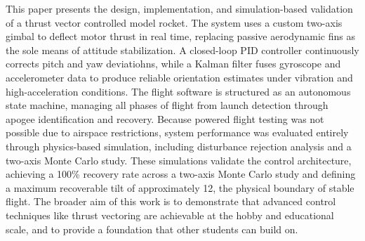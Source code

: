 This paper presents the design, implementation, and simulation-based validation of a thrust vector
controlled model rocket. The system uses a custom two-axis gimbal to deflect motor thrust in real time,
replacing passive aerodynamic fins as the sole means of attitude stabilization. A closed-loop PID controller continuously corrects pitch and yaw deviatiohns, while a Kalman filter fuses gyroscope and accelerometer data to produce reliable orientation estimates under vibration and high-acceleration conditions. 
The flight software is structured as an autonomous state machine, managing all phases of
flight from launch detection through apogee identification and recovery. Because powered flight testing
was not possible due to airspace restrictions, system performance was evaluated entirely through
physics-based simulation, including disturbance rejection analysis and a two-axis Monte Carlo study.
These simulations validate the control architecture, achieving a 100\% recovery rate across a two-axis Monte Carlo study and defining a maximum recoverable tilt of approximately 12\degree{}, the physical boundary of stable flight.
The broader aim of this work is to demonstrate that advanced control techniques like thrust vectoring
are achievable at the hobby and educational scale, and to provide a foundation that other students can
build on.
